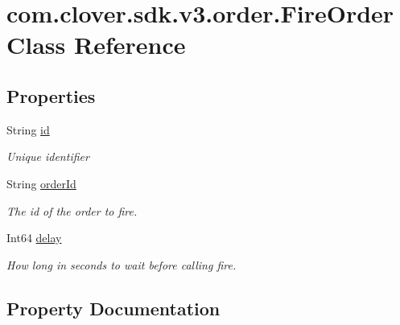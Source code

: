 \hypertarget{classcom_1_1clover_1_1sdk_1_1v3_1_1order_1_1_fire_order}{}\section{com.\+clover.\+sdk.\+v3.\+order.\+Fire\+Order Class Reference}
\label{classcom_1_1clover_1_1sdk_1_1v3_1_1order_1_1_fire_order}
\subsection*{Properties}
\begin{DoxyCompactItemize}
\item 
String \hyperlink{classcom_1_1clover_1_1sdk_1_1v3_1_1order_1_1_fire_order_a67ccc9bed5206192b4da536dfbc4595f}{id}
\begin{DoxyCompactList}\small\item\em Unique identifier \end{DoxyCompactList}\item 
String \hyperlink{classcom_1_1clover_1_1sdk_1_1v3_1_1order_1_1_fire_order_a99284e04888e31790949f4ede72eb805}{order\+Id}
\begin{DoxyCompactList}\small\item\em The id of the order to fire. \end{DoxyCompactList}\item 
Int64 \hyperlink{classcom_1_1clover_1_1sdk_1_1v3_1_1order_1_1_fire_order_a375094a9e2b7281fd66b50bb72d57544}{delay}
\begin{DoxyCompactList}\small\item\em How long in seconds to wait before calling fire. \end{DoxyCompactList}\end{DoxyCompactItemize}


\subsection{Property Documentation}
\mbox{\label{classcom_1_1clover_1_1sdk_1_1v3_1_1order_1_1_fire_order_a375094a9e2b7281fd66b50bb72d57544}} 
